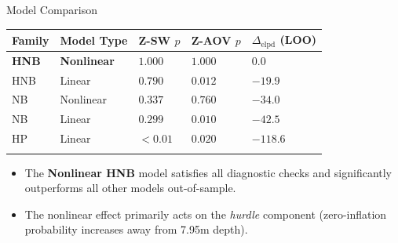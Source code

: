 \documentclass[
  ignorenonframetext,
]{beamer}
\newcounter{none} %
\providecommand{\tightlist}{%
  \setlength{\itemsep}{0pt}\setlength{\parskip}{0pt}}
\begin{document}
\begin{frame}{Model Comparison}
\protect{}\label{model-comparison}
{\def\LTcaptype{none} %
\begin{longtable}[]{@{}
  >{\raggedright\arraybackslash}p{}
  >{\raggedright\arraybackslash}p{}
  >{\raggedright\arraybackslash}p{}
  >{\raggedright\arraybackslash}p{}
  >{\raggedright\arraybackslash}p{}@{}}
\toprule\noalign{}
\begin{minipage}[b]{\linewidth}\raggedright
Family
\end{minipage} & \begin{minipage}[b]{\linewidth}\raggedright
Model Type
\end{minipage} & \begin{minipage}[b]{\linewidth}\raggedright
Z-SW \(p\)
\end{minipage} & \begin{minipage}[b]{\linewidth}\raggedright
Z-AOV \(p\)
\end{minipage} & \begin{minipage}[b]{\linewidth}\raggedright
\(\Delta_{\text{elpd}}\) (LOO)
\end{minipage} \\
\midrule\noalign{}
\endhead
\textbf{HNB} & \textbf{Nonlinear} & \(1.000\) & \(1.000\) &
\textbf{\(0.0\)} \\
HNB & Linear & \(0.790\) & \(0.012\) & \(-19.9\) \\
NB & Nonlinear & \(0.337\) & \(0.760\) & \(-34.0\) \\
NB & Linear & \(0.299\) & \(0.010\) & \(-42.5\) \\
HP & Linear & \(<0.01\) & \(0.020\) & \(-118.6\) \\
\bottomrule\noalign{}
\end{longtable}
}

\begin{itemize}
\tightlist
\item
  The \textbf{Nonlinear HNB} model satisfies all diagnostic checks and
  significantly outperforms all other models out-of-sample.
\item
  The nonlinear effect primarily acts on the \emph{hurdle} component
  (zero-inflation probability increases away from 7.95m depth).
\end{itemize}
\end{frame}
\end{document}
